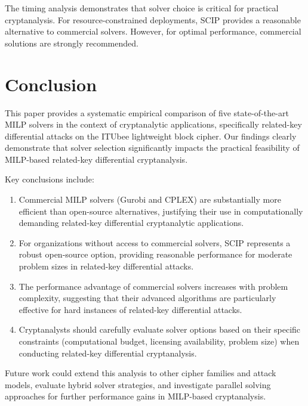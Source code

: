 \documentclass[11pt,a4paper]{article}
\begin{document}
The timing analysis demonstrates that solver choice is critical for practical cryptanalysis. For resource-constrained deployments, SCIP provides a reasonable alternative to commercial solvers. However, for optimal performance, commercial solutions are strongly recommended.

\section{Conclusion}

This paper provides a systematic empirical comparison of five state-of-the-art MILP solvers in the context of cryptanalytic applications, specifically related-key differential attacks on the ITUbee lightweight block cipher. Our findings clearly demonstrate that solver selection significantly impacts the practical feasibility of MILP-based related-key differential cryptanalysis.

Key conclusions include:
\begin{enumerate}
    \item Commercial MILP solvers (Gurobi and CPLEX) are substantially more efficient than open-source alternatives, justifying their use in computationally demanding related-key differential cryptanalytic applications.
    \item For organizations without access to commercial solvers, SCIP represents a robust open-source option, providing reasonable performance for moderate problem sizes in related-key differential attacks.
    \item The performance advantage of commercial solvers increases with problem complexity, suggesting that their advanced algorithms are particularly effective for hard instances of related-key differential attacks.
    \item Cryptanalysts should carefully evaluate solver options based on their specific constraints (computational budget, licensing availability, problem size) when conducting related-key differential cryptanalysis.
\end{enumerate}

Future work could extend this analysis to other cipher families and attack models, evaluate hybrid solver strategies, and investigate parallel solving approaches for further performance gains in MILP-based cryptanalysis.
\end{document}
